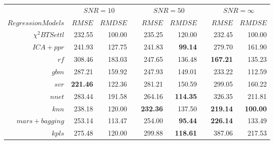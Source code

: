 \newcommand{\ra}[1]{\renewcommand{\arraystretch}{#1}}
\begin{table}\centering
\ra{1.3}
\begin{tabular}{@{}rrrcrrcrr@{}}\toprule
& \multicolumn{2}{c}{$SNR = 10$} & \phantom{ab}& \multicolumn{2}{c}{$SNR = 50$} &
\phantom{ab} & \multicolumn{2}{c}{$SNR = \infty$}\\
\cmidrule{2-3} \cmidrule{5-6} \cmidrule{8-9}
$Regression Models$ & $RMSE$ & $RMDSE$ && $RMSE$ & $RMDSE$ && $RMSE$ & $RMDSE$ \\ \midrule
$\chi^2 BTSettl$    &  232.55 & 100.00 && 235.25 & 120.00 && 232.45 & 100.00 \\
$ ICA+ ppr$         & 241.93 & 127.75 && 241.83 & \bf{99.14} && 279.70 & 161.90 \\
$rf $               & 308.46 & 183.03 && 247.65 & 136.48 && \bf{167.21} & 135.23 \\
$gbm $              & 287.21 & 159.92 && 247.93 & 149.01 && 233.22 & 112.59 \\
$ svr $         & \bf{221.46} & 122.36 && 281.21 & 150.59 && 299.05 & 160.22 \\
$ nnet $            & 283.44 & 191.58 && 264.16 & \bf{114.35} && 326.35 & 211.81 \\
$ knn $             & 238.18 & 120.00 && \bf{232.36} & 137.50 && \bf{219.14} & \bf{100.00}  \\
$ mars+ bagging $   & 253.14 & 113.47 && 254.00 & \bf{95.44} && \bf{226.14} & 133.49 \\
$ kpls $            & 275.48 & 120.00 && 299.88 & \bf{118.61} && 387.06 & 217.53 \\







\end{tabular}
\end{table}
